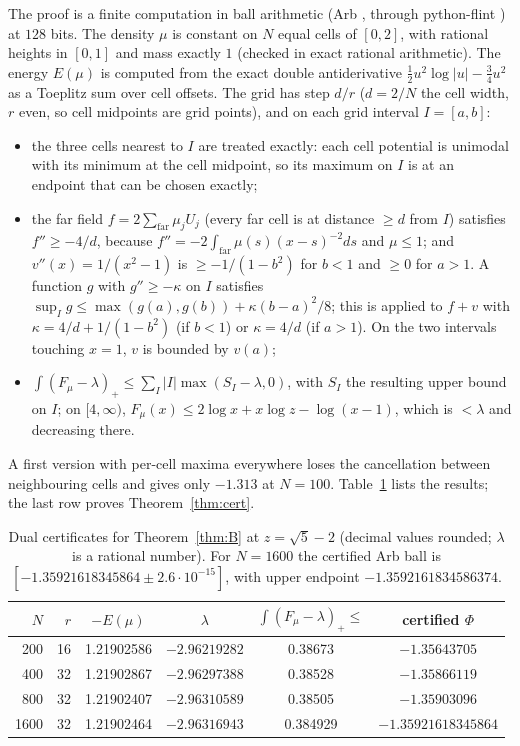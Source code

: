 \documentclass[11pt]{amsart}
\theoremstyle{definition}
\theoremstyle{remark}
\numberwithin{equation}{section}
\begin{document}
The proof is a finite computation in ball arithmetic (Arb \cite{Arb}, through python-flint \cite{pythonflint}) at $128$
bits. The density $\mu$ is constant on $N$ equal cells of $[0,2]$, with rational heights in $[0,1]$ and mass exactly $1$
(checked in exact rational arithmetic). The energy $E(\mu)$ is computed from the exact double antiderivative
$\frac12u^2\log|u|-\frac34u^2$ as a Toeplitz sum over cell offsets. The grid has step $d/r$ ($d=2/N$ the cell width,
$r$ even, so cell midpoints are grid points), and on each grid interval $I=[a,b]$:
\begin{itemize}
\item the three cells nearest to $I$ are treated exactly: each cell potential is unimodal with its minimum at the cell
  midpoint, so its maximum on $I$ is at an endpoint that can be chosen exactly;
\item the far field $f=2\sum_{\text{far}}\mu_jU_j$ (every far cell is at distance $\ge d$ from $I$) satisfies
  $f''\ge-4/d$, because $f''=-2\int_{\text{far}}\mu(s)(x-s)^{-2}ds$ and $\mu\le1$; and $v''(x)=1/(x^2-1)$ is $\ge-1/(1-b^2)$
  for $b<1$ and $\ge0$ for $a>1$. A function $g$ with $g''\ge-\kappa$ on $I$ satisfies
  $\sup_Ig\le\max(g(a),g(b))+\kappa(b-a)^2/8$; this is applied to $f+v$ with $\kappa=4/d+1/(1-b^2)$ (if $b<1$) or
  $\kappa=4/d$ (if $a>1$). On the two intervals touching $x=1$, $v$ is bounded by $v(a)$;
\item $\int(F_\mu-\lambda)_+\le\sum_I|I|\max(S_I-\lambda,0)$, with $S_I$ the resulting upper bound on $I$; on
  $[4,\infty)$, $F_\mu(x)\le2\log x+x\log z-\log(x-1)$, which is $<\lambda$ and decreasing there.
\end{itemize}
A first version with per-cell maxima everywhere loses the cancellation between neighbouring cells and gives only
$-1.313$ at $N=100$. Table~\ref{tab:cert} lists the results; the last row proves Theorem~\ref{thm:cert}.

\begin{table}[ht]
\centering\small
\begin{tabular}{@{}rrcccc@{}}
\toprule
$N$ & $r$ & $-E(\mu)$ & $\lambda$ & $\int(F_\mu-\lambda)_+\le$ & certified $\Phi$\\
\midrule
200 & 16 & 1.21902586 & $-2.96219282$ & 0.38673 & $-1.35643705$\\
400 & 32 & 1.21902867 & $-2.96297388$ & 0.38528 & $-1.35866119$\\
800 & 32 & 1.21902407 & $-2.96310589$ & 0.38505 & $-1.35903096$\\
1600 & 32 & 1.21902464 & $-2.96316943$ & 0.384929 & $-1.35921618345864$\\
\bottomrule
\end{tabular}
\caption{Dual certificates for Theorem~\ref{thm:B} at $z=\sqrt5-2$ (decimal values rounded; $\lambda$ is a rational
number). For $N=1600$ the certified Arb ball is $[-1.35921618345864\pm2.6\cdot10^{-15}]$, with upper endpoint
$-1.3592161834586374$.}\label{tab:cert}
\end{table}
\end{document}

